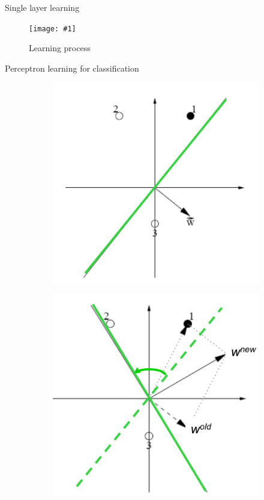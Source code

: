 \documentclass[9pt,t]{beamer}
\newcommand{\picHereWidth}[4] { %
    \begin{figure}[htp] %
        \centering
        \texttt{[image: \#1]} %
        \caption{#2} %
        \label{#3}
    \end{figure} %
}
\begin{document}
\begin{frame}{Single layer learning}
    \picHereWidth{learning.png}{Learning process}{fig:learning}{0.6\linewidth}
    \begin{alertblock}{Perceptron learning for classification}
        \begin{figure}[htp!]
            \centering
            \begin{subfigure}{.3\textwidth}
                \centering
                \includegraphics[width=\linewidth]{perceptron_learning1.png}
            \end{subfigure}%
            \begin{subfigure}{.3\textwidth}
                \centering
                \includegraphics[width=\linewidth]{perceptron_learning2.png}

\end{subfigure}
\end{figure}
\end{alertblock}
\end{frame}
\end{document}
